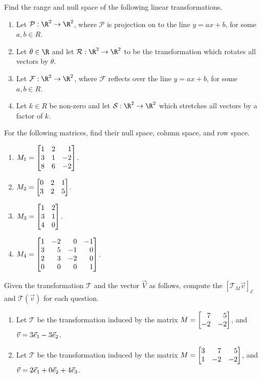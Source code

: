 \begin{exercises}
	\begin{problist}
		\prob  Find the range and null space of the following linear transformations.
		\begin{enumerate}
		    \item   Let $\mathcal P:\R^2\to\R^2$, where $\mathcal P$ is projection on to the line $y=ax+b$, for some $a,b \in R$.
			\item   Let $\theta\in \R$ and let $\mathcal R:\R^2\to\R^2$ to be the transformation which rotates all vectors by $\theta$.
			\item   Let $\mathcal F:\R^2\to\R^2$, where $\mathcal F$ reflects over the line $y=ax+b$, for some $a,b \in R$.
			\item   Let $k\in R$ be non-zero and let $\mathcal S:\R^2\to\R^2$ which stretches all vectors by a factor of $k$.
		\end{enumerate}
		
		\prob For the following matrices, find their null space, column space, and row space.
		    \begin{enumerate}
		        \item $M_1=\mat{1&2&1\\3&1&-2\\8&6&-2}$.
		        \item $M_2=\mat{0&2&1\\3&2&5}$.
		        \item $M_3=\mat{1&2\\3&1\\4&0}$.
		        \item $M_4=\mat{1&-2&0&-1\\3&5&-1&0\\2&3&-2&0\\0&0&0&1}$.
		    \end{enumerate}
		
		\prob Given the transformation $\mathcal T$ and the vector $\vec V$ as follows, compute the $[\mathcal T_{M}\vec v]_{\mathcal E}$ and $\mathcal T(\vec v)$ for each question.
		\begin{enumerate}
		    \item Let $\mathcal T$ be the transformation induced by the matrix $M=\mat{7&5\\-2&-2}$,
	    and $\vec v=3{\vec e_1}-3{\vec e_2}$.
	        \item Let $\mathcal T$ be the transformation induced by the matrix $M=\mat{3&7&5\\1&-2&-2}$,
	    and $\vec v=2{\vec e_1}+0{\vec e_2}+4{\vec e_3}$.
		\end{enumerate}
		

\end{problist}
\end{exercises}
